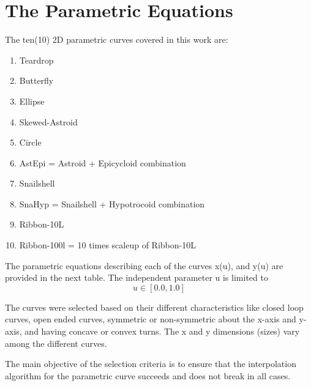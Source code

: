 
	
\section{The Parametric Equations}


The ten(10) 2D parametric curves covered in this work are:
\begin{enumerate}
	\item Teardrop
	\item Butterfly
	\item Ellipse
	\item Skewed-Astroid
	\item Circle
	\item AstEpi = Astroid + Epicycloid combination
	\item Snailshell
	\item SnaHyp = Snailshell + Hypotrocoid combination
	\item Ribbon-10L
	\item Ribbon-100l = 10 times scaleup of Ribbon-10L
	
\end{enumerate}

The parametric equations describing each of the curves x(u), and y(u) are provided in the next table. The independent parameter u is limited to
\begin{equation}
u  \in  [0.0, 1.0] \nonumber
\end{equation}

The curves were selected based on their different characteristics like closed loop curves, open ended curves, symmetric or non-symmetric about the x-axis and y-axis, and having concave or convex turns. The x and y dimensions (sizes) vary among the different curves. \vspace*{1\baselineskip}

The main objective of the selection criteria is to ensure that the interpolation algorithm for the parametric curve succeeds and does not break in all cases. \vspace*{1\baselineskip}
	
